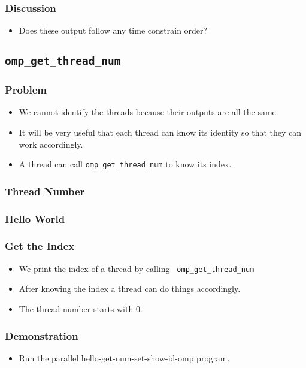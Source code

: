 \documentclass{beamer}
\begin{document}
\begin{frame}
\frametitle{Discussion}
\begin{itemize}
\item Does these output follow any time constrain order?
\end{itemize}
\end{frame}

\subsection{\tt omp\_get\_thread\_num}

\begin{frame}
\frametitle{Problem}
\begin{itemize}
\item We cannot identify the threads because their outputs are all the
  same.
\item It will be very useful that each thread can know its identity so
  that they can work accordingly.
\item A thread can call {\tt omp\_get\_thread\_num} to know its index.
\end{itemize}
\end{frame}

\begin{frame}
\frametitle{Thread Number}
\end{frame}


\begin{frame}
\frametitle{Hello World}
\end{frame}

\begin{frame}
\frametitle{Get the Index}
\begin{itemize}
\item We print the index of a thread by calling {\tt
  omp\_get\_thread\_num}
\item After knowing the index a thread can do things accordingly.
\item The thread number starts with 0.
\end{itemize}
\end{frame}

\begin{frame}
\frametitle{Demonstration}
\begin{itemize}
\item Run the parallel hello-get-num-set-show-id-omp program.
\end{itemize}
\end{frame}
\end{document}
